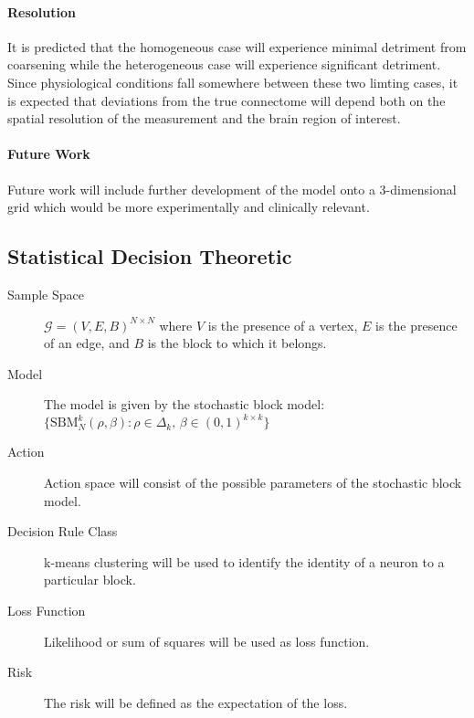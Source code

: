 \documentclass[12pt]{article}
\begin{document}
\paragraph{Resolution}
It is predicted that the homogeneous case will experience minimal detriment from
coarsening while the heterogeneous case will experience significant detriment.
Since physiological conditions fall somewhere between these two limting cases,
it is expected that deviations from the true connectome will depend both on the
spatial resolution of the measurement and the brain region of interest.

\paragraph{Future Work}
Future work will include further development of the model onto a 3-dimensional
grid which would be more experimentally and clinically relevant.

\pagebreak
\subsection*{Statistical Decision Theoretic}
\begin{description}
\item[Sample Space]
$\mathscr{G} = (V,E,B)^{N\times N}$ where $V$ is the
presence of a vertex, $E$ is the presence of an edge, and $B$ is the block to
which it belongs.

\item[Model] 
The model is given by the stochastic block model:\\
$\{\text{SBM}_N^k(\rho,\beta): \rho \in\Delta_k
\text{, }\beta\in(0,1)^{k\times k}\}$

\item[Action]
Action space will consist of the possible parameters of the stochastic block
model.

\item[Decision Rule Class]
k-means clustering will be used to identify the identity of a neuron to a
particular block.

\item[Loss Function]
Likelihood or sum of squares will be used as loss function.

\item[Risk]
The risk will be defined as the expectation of the loss.
\end{description}
\end{document}
